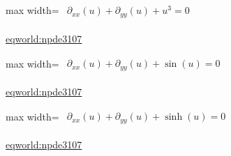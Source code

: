 \documentclass[10pt,a4paper]{article}
\begin{document}
\begin{minipage}{\linewidth}
\begin{center}\begin{adjustbox}{max width=\linewidth}$\displaystyle\begin{gathered}\begin{gathered}\partial_{xx}(u)+\partial_{yy}(u)+u^{3}=0\end{gathered}\end{gathered}$\end{adjustbox}\end{center}
{\small \href{https://eqworld.ipmnet.ru/en/solutions/npde/npde3107.pdf}{eqworld:npde3107}}\par
\end{minipage}\par\vspace{7mm}

\begin{minipage}{\linewidth}
\begin{center}\begin{adjustbox}{max width=\linewidth}$\displaystyle\begin{gathered}\begin{gathered}\partial_{xx}(u)+\partial_{yy}(u)+\sin(u)=0\end{gathered}\end{gathered}$\end{adjustbox}\end{center}
{\small \href{https://eqworld.ipmnet.ru/en/solutions/npde/npde3107.pdf}{eqworld:npde3107}}\par
\end{minipage}\par\vspace{7mm}

\begin{minipage}{\linewidth}
\begin{center}\begin{adjustbox}{max width=\linewidth}$\displaystyle\begin{gathered}\begin{gathered}\partial_{xx}(u)+\partial_{yy}(u)+\sinh(u)=0\end{gathered}\end{gathered}$\end{adjustbox}\end{center}
{\small \href{https://eqworld.ipmnet.ru/en/solutions/npde/npde3107.pdf}{eqworld:npde3107}}\par
\end{minipage}\par\vspace{7mm}
\end{document}
